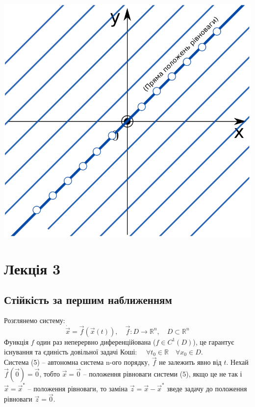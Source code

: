 \documentclass[14pt,a4paper]{scrartcl}
\theoremstyle{definition}
\theoremstyle{definition}
\theoremstyle{definition}
\newcommand*{\vect}[1]{\overrightarrow{\ensuremath{#1}}}
\begin{document}
\begin{center} \includegraphics[scale=0.3]{assets/lectures_recent-49093f01.png} \end{center}

\section{Лекція 3}
\subsection{Стійкість за першим наближенням}

Розглянемо систему:
\begin{equation}
  \dot{\vect{x}} = \overrightarrow{f}(\overrightarrow{x}(t)), \quad \overrightarrow{f}: D \rightarrow \mathbb{R}^n, \quad D \subset \mathbb{R}^n
\end{equation}
Функція $f$ один раз неперервно диференційована ($f \in C^1(D)$), це гарантує існування та єдиність довільної задачі Коші: $\quad \forall t_0 \in \mathbb{R} \quad \forall x_0 \in D$. \\
Система (5) -- автономна система n-ого порядку, $\overrightarrow{f}$ не залежить явно від $t$.
Нехай $\overrightarrow{f}(\overrightarrow{0}) = \overrightarrow{0}$, тобто $\overrightarrow{x} = \overrightarrow{0}$ -- положення рівноваги системи (5), якщо це не так і $\overrightarrow{x} = \overrightarrow{x}^*$ -- положення рівноваги, то заміна $\overrightarrow{z} = \overrightarrow{x} - \overrightarrow{x}^*$ зведе задачу до положення рівноваги $\overrightarrow{z} = \overrightarrow{0}$.
\end{document}
